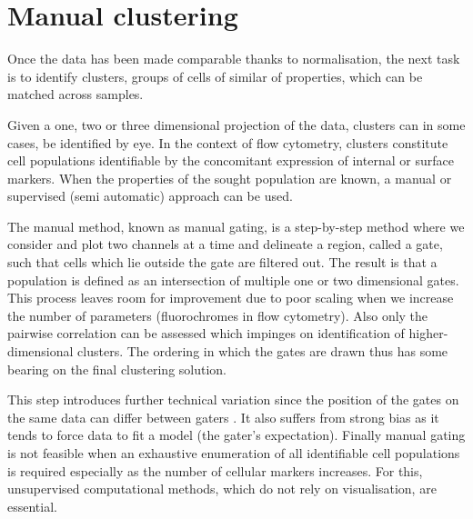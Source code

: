 \section{Manual clustering}

Once the data has been made comparable thanks to normalisation, the next task is to identify clusters, groups of cells of similar of properties,
which can be matched across samples.  

Given a one, two or three dimensional projection of the data, clusters can in some cases, be identified by eye.
In the context of flow cytometry, clusters constitute cell populations identifiable by the concomitant expression of internal or surface markers.
When the properties of the sought population are known, a manual or supervised (semi automatic) approach can be used.

The manual method, known as manual gating,
is a step-by-step method where we consider and plot two channels at a time and delineate a region, called a gate, such that cells which lie outside the gate are filtered out.
The result is that a population is defined as an intersection of multiple one or two dimensional gates.
This process leaves room for improvement due to poor scaling when we increase the number of parameters (fluorochromes in flow cytometry).
Also only the pairwise correlation can be assessed which impinges
on identification of higher-dimensional clusters.
The ordering in which the gates are drawn thus has some bearing on the final clustering solution.

This step introduces further technical variation since the position of the gates
on the same data can differ between gaters \citep{Maecker:2010fg}.
It also suffers from strong bias as it tends to force data to fit a model (the gater's expectation).
Finally manual gating is not feasible when an exhaustive enumeration of all identifiable cell populations is required \citep{Siebert:2010iv,Aghaeepour:2012fq} especially
as the number of cellular markers increases.
For this, unsupervised computational methods, which do not rely on visualisation, are essential.


